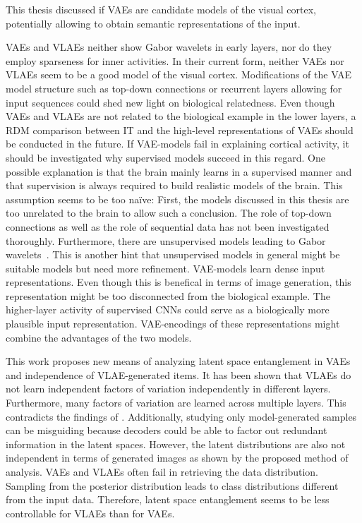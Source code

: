 This thesis discussed if \acfp{VAE} are candidate models of the visual cortex, potentially allowing to obtain semantic representations of the input.

\acp{VAE} and \acp{VLAE} neither show Gabor wavelets in early layers, nor do they employ sparseness for inner activities.
In their current form, neither \acp{VAE} nor \acp{VLAE} seem to be a good model of the visual cortex.
Modifications of the \ac{VAE} model structure such as top-down connections or recurrent layers allowing for input sequences could shed new light on biological relatedness.
Even though \acp{VAE} and \acp{VLAE} are not related to the biological example in the lower layers, a \ac{RDM} comparison between \ac{IT} and the high-level representations of \acp{VAE} should be conducted in the future.
If \ac{VAE}-models fail in explaining cortical activity, it should be investigated why supervised models succeed in this regard.
One possible explanation is that the brain mainly learns in a supervised manner and that supervision is always required to build realistic models of the brain.
This assumption seems to be too naïve:
First, the models discussed in this thesis are too unrelated to the brain to allow such a conclusion.
The role of top-down connections as well as the role of sequential data has not been investigated thoroughly.
Furthermore, there are unsupervised models leading to Gabor wavelets~\citep{Olshausen1996,berkes2005slow}.
This is another hint that unsupervised models in general might be suitable models but need more refinement.
\ac{VAE}-models learn dense input representations.
Even though this is benefical in terms of image generation, this representation might be too disconnected from the biological example.
The higher-layer activity of supervised \acp{CNN} could serve as a biologically more plausible input representation.
\ac{VAE}-encodings of these representations might combine the advantages of the two models.

This work proposes new means of analyzing latent space entanglement in \acp{VAE} and independence of \ac{VLAE}-generated items.
It has been shown that \acp{VLAE} do not learn independent factors of variation independently in different layers.
Furthermore, many factors of variation are learned across multiple layers.
This contradicts the findings of \citet{zhao2017learning}.
Additionally, studying only model-generated samples can be misguiding because decoders could be able to factor out redundant information in the latent spaces.
However, the latent distributions are also not independent in terms of generated images as shown by the proposed method of analysis.
\acp{VAE} and \acp{VLAE} often fail in retrieving the data distribution.
Sampling from the posterior distribution leads to class distributions different from the input data.
Therefore, latent space entanglement seems to be less controllable for \acp{VLAE} than for \acp{VAE}.

